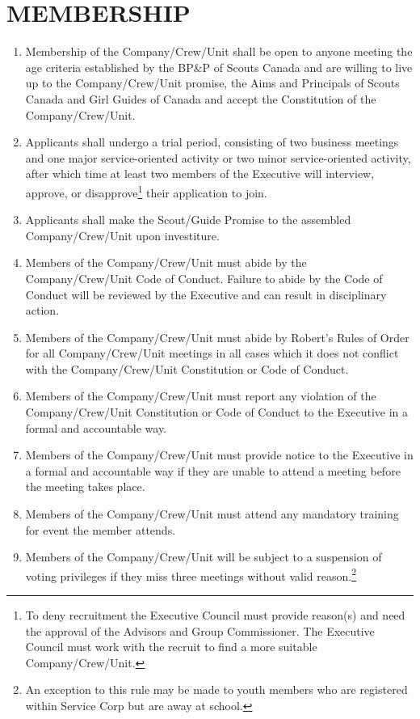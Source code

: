 \documentclass{Service_Corps_Document}
\begin{document}
    \section{MEMBERSHIP}\label{sec:membership}
    \begin{enumerate}
        \item Membership of the Company/Crew/Unit shall be open to anyone meeting the age criteria established by the BP\&P of Scouts Canada and are willing to live up to the Company/Crew/Unit promise, the Aims and Principals of Scouts Canada and Girl Guides of Canada and accept the Constitution of the Company/Crew/Unit.
        \item Applicants shall undergo a trial period, consisting of two business meetings and one major service-oriented activity or two minor service-oriented activity, after which time at least two members of the Executive will interview, approve, or disapprove\footnote{To deny recruitment the Executive Council must provide reason(s) and need the approval of the Advisors and Group Commissioner. The Executive Council must work with the recruit to find a more suitable Company/Crew/Unit.} their application to join.
        \item Applicants shall make the Scout/Guide Promise to the assembled Company/Crew/Unit upon investiture.
        \item Members of the Company/Crew/Unit must abide by the Company/Crew/Unit Code of Conduct.
        Failure to abide by the Code of Conduct will be reviewed by the Executive and can result in disciplinary action.
        \item Members of the Company/Crew/Unit must abide by Robert's Rules of Order for all Company/Crew/Unit meetings in all cases which it does not conflict with the Company/Crew/Unit Constitution or Code of Conduct.
        \item Members of the Company/Crew/Unit must report any violation of the Company/Crew/Unit Constitution or Code of Conduct to the Executive in a formal and accountable way.
        \item Members of the Company/Crew/Unit must provide notice to the Executive in a formal and accountable way if they are unable to attend a meeting before the meeting takes place.
        \item Members of the Company/Crew/Unit must attend any mandatory training for event the member attends.
        \item Members of the Company/Crew/Unit will be subject to a suspension of voting privileges if they miss three meetings without valid reason.\footnote{An exception to this rule may be made to youth members who are registered within Service Corp but are away at school.}

\end{enumerate}
\end{document}

